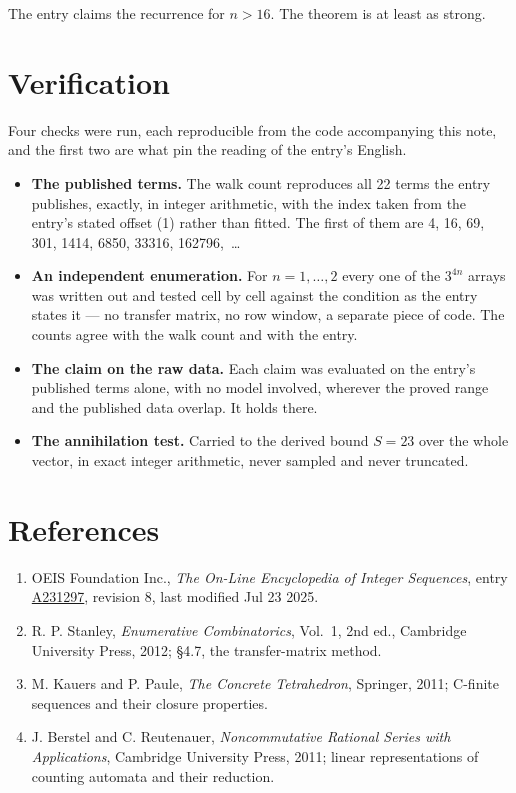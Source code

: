 \documentclass[11pt]{article}
\theoremstyle{definition}
\begin{document}
The entry claims the recurrence for $n > 16$. The theorem is at least as strong.

\section{Verification}

Four checks were run, each reproducible from the code accompanying this note, and the first two are what pin the reading of the entry's English.

\begin{itemize}

\item {\bfseries The published terms.} The walk count reproduces all 22 terms the entry publishes, exactly, in integer arithmetic, with the index taken from the entry's stated offset (1) rather than fitted. The first of them are 4, 16, 69, 301, 1414, 6850, 33316, 162796,~\dots

\item {\bfseries An independent enumeration.} For $n = 1,\dots,2$ every one of the $3^{4n}$ arrays was written out and tested cell by cell against the condition as the entry states it --- no transfer matrix, no row window, a separate piece of code. The counts agree with the walk count and with the entry.

\item {\bfseries The claim on the raw data.} Each claim was evaluated on the entry's published terms alone, with no model involved, wherever the proved range and the published data overlap. It holds there.

\item {\bfseries The annihilation test.} Carried to the derived bound $S = 23$ over the whole vector, in exact integer arithmetic, never sampled and never truncated.

\end{itemize}

\section{References}

\begin{enumerate}

\item OEIS Foundation Inc., \emph{The On-Line Encyclopedia of Integer Sequences}, entry \href{https://oeis.org/A231297}{A231297}, revision 8, last modified Jul 23 2025.

\item R. P. Stanley, \emph{Enumerative Combinatorics}, Vol.~1, 2nd ed., Cambridge University Press, 2012; \S4.7, the transfer-matrix method.

\item M. Kauers and P. Paule, \emph{The Concrete Tetrahedron}, Springer, 2011; C-finite sequences and their closure properties.

\item J. Berstel and C. Reutenauer, \emph{Noncommutative Rational Series with Applications}, Cambridge University Press, 2011; linear representations of counting automata and their reduction.

\end{enumerate}
\end{document}
